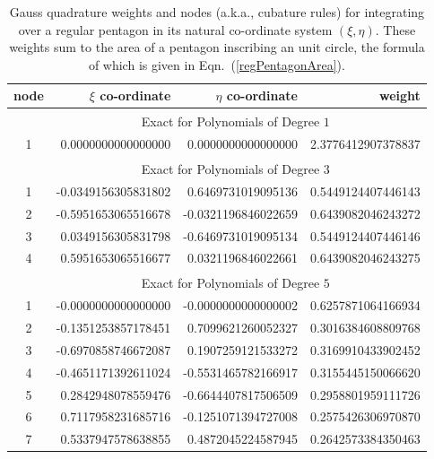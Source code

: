 \begin{table}
    \centering
    \begin{tabular}{|c|rrr|}
        \hline
        node & \centering $\xi$ co-ordinate \phantom{123}  & 
        $\eta$ co-ordinate \phantom{123} & weight \phantom{12345} \\ \hline
        & \multicolumn{3}{|c|}{Exact for Polynomials of Degree $1^{\phantom{|^|}}$} \\ \hline
        1 & 0.0000000000000000 & 0.0000000000000000 &
        2.3776412907378837\vphantom{$|^{|^|}$} \\ 
        \hline
        & \multicolumn{3}{|c|}{Exact for Polynomials of Degree $3^{\phantom{|^|}}$} \\ \hline
        1 & -0.0349156305831802 &  0.6469731019095136 &
        0.5449124407446143\vphantom{$|^{|^|}$} \\
        2 & -0.5951653065516678 & -0.0321196846022659 & 0.6439082046243272 \\
        3 &  0.0349156305831798 & -0.6469731019095134 & 0.5449124407446146 \\
        4 &  0.5951653065516677 &  0.0321196846022661 & 0.6439082046243275 \\ 
        \hline
        & \multicolumn{3}{|c|}{Exact for Polynomials of Degree $5^{\phantom{|^|}}$} \\ \hline
        1 & -0.0000000000000000 & -0.0000000000000002 &
        0.6257871064166934\vphantom{$|^{|^|}$} \\
        2 & -0.1351253857178451 &  0.7099621260052327 & 0.3016384608809768 \\
        3 & -0.6970858746672087 &  0.1907259121533272 & 0.3169910433902452 \\ 
        4 & -0.4651171392611024 & -0.5531465782166917 & 0.3155445150066620 \\
        5 &  0.2842948078559476 & -0.6644407817506509 & 0.2958801959111726 \\
        6 &  0.7117958231685716 & -0.1251071394727008 & 0.2575426306970870 \\
        7 &  0.5337947578638855 &  0.4872045224587945 & 0.2642573384350463 \\
        \hline
    \end{tabular}
    \caption{Gauss quadrature weights and nodes (a.k.a., cubature rules) for integrating over a regular pentagon in its natural co-ordinate system $( \xi , \eta )$.  These weights sum to the area of a pentagon inscribing an unit circle, the formula of which is given in Eqn.~(\ref{regPentagonArea}).}
    \label{tabQuadrature}
\end{table}


